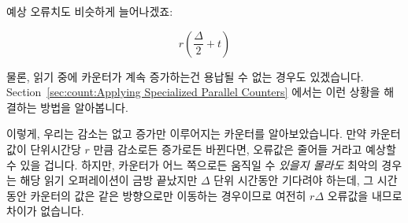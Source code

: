 \begin{enumerate}
	예상 오류치도 비슷하게 늘어나겠죠:

	\begin{equation}
		r \left( \frac{\Delta}{2} + t \right)
	\end{equation}

	물론, 읽기 중에 카운터가 계속 증가하는건 용납될 수 없는 경우도
	있겠습니다.
	Section~\ref{sec:count:Applying Specialized Parallel Counters}
	에서는 이런 상황을 해결하는 방법을 알아봅니다.

	이렇게, 우리는 감소는 없고 증가만 이루어지는 카운터를 알아보았습니다.
	만약 카운터 값이 단위시간당 $r$ 만큼 감소로든 증가로든 바뀐다면,
	오류값은 줄어들 거라고 예상할 수 있을 겁니다.
	하지만, 카운터가 어느 쪽으로든 움직일 수 \emph{있을지 몰라도} 최악의
	경우는 해당 읽기 오퍼레이션이 금방 끝났지만 $\Delta$ 단위 시간동안
	기다려야 하는데, 그 시간 동안 카운터의 값은 같은 방향으로만 이동하는
	경우이므로 여전히 $r \Delta$ 오류값을 내므로 차이가 없습니다.

\end{enumerate}
